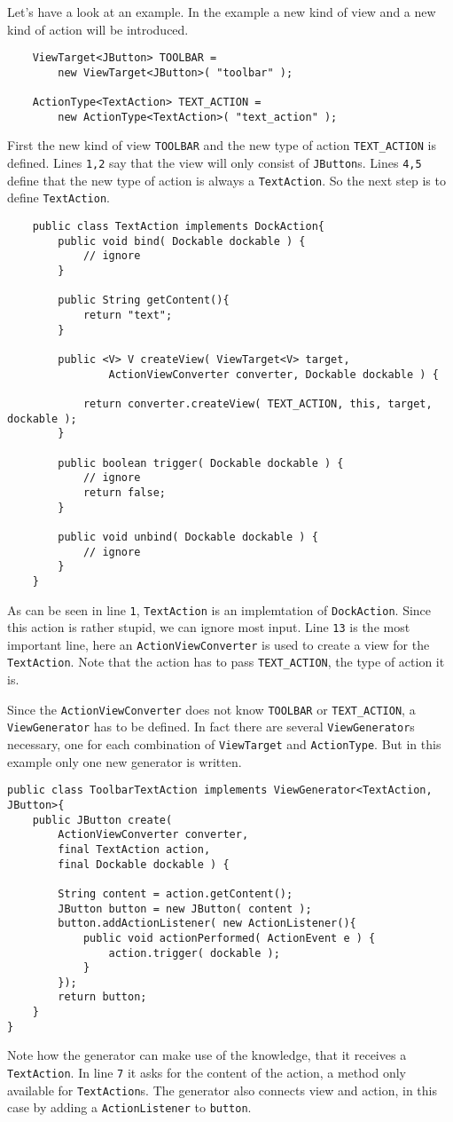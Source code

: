 \documentclass[a4paper,10pt]{article}
\newcommand{\src}[1]{\lstinline[basicstyle=\normalsize\ttfamily,keywordstyle=\normalsize\ttfamily,identifierstyle=\normalsize\ttfamily]|#1|}
\begin{document}
Let's have a look at an example. In the example a new kind of view and a new kind of action will be introduced.
\begin{lstlisting}
    ViewTarget<JButton> TOOLBAR = 
        new ViewTarget<JButton>( "toolbar" );
    
    ActionType<TextAction> TEXT_ACTION =
        new ActionType<TextAction>( "text_action" );
\end{lstlisting}
First the new kind of view \src{TOOLBAR} and the new type of action \src{TEXT_ACTION} is defined. Lines \src{1,2} say that the view will only consist of \src{JButton}s. Lines \src{4,5} define that the new type of action is always a \src{TextAction}. So the next step is to define \src{TextAction}.
\begin{lstlisting}
    public class TextAction implements DockAction{
        public void bind( Dockable dockable ) {
            // ignore
        }
        
        public String getContent(){
            return "text";
        }

        public <V> V createView( ViewTarget<V> target, 
                ActionViewConverter converter, Dockable dockable ) {
            
            return converter.createView( TEXT_ACTION, this, target, dockable ); 
        }

        public boolean trigger( Dockable dockable ) {
            // ignore
            return false;
        }

        public void unbind( Dockable dockable ) {
            // ignore
        }    
    }
\end{lstlisting}
As can be seen in line \src{1}, \src{TextAction} is an implemtation of \src{DockAction}. Since this action is rather stupid, we can ignore most input. Line \src{13} is the most important line, here an \src{ActionViewConverter} is used to create a view for the \src{TextAction}. Note that the action has to pass \src{TEXT_ACTION}, the type of action it is.

Since the \src{ActionViewConverter} does not know \src{TOOLBAR} or \src{TEXT_ACTION}, a \src{ViewGenerator} has to be defined. In fact there are several \src{ViewGenerator}s necessary, one for each combination of \src{ViewTarget} and \src{ActionType}. But in this example only one new generator is written.
\begin{lstlisting}
public class ToolbarTextAction implements ViewGenerator<TextAction, JButton>{
	public JButton create(
		ActionViewConverter converter,
		final TextAction action,
		final Dockable dockable ) {

		String content = action.getContent();
		JButton button = new JButton( content );
		button.addActionListener( new ActionListener(){
			public void actionPerformed( ActionEvent e ) {
				action.trigger( dockable );
			}
		});
		return button;
	}
}
\end{lstlisting}
Note how the generator can make use of the knowledge, that it receives a \src{TextAction}. In line \src{7} it asks for the content of the action, a method only available for \src{TextAction}s. The generator also connects view and action, in this case by adding a \src{ActionListener} to \src{button}.
\end{document}
